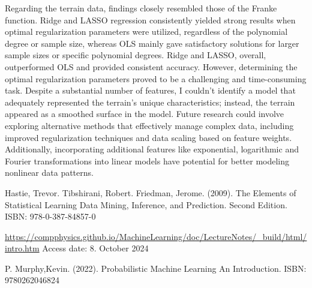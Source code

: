 \documentclass[a4paper,12pt]{article}
\begin{document}
\noindent
Regarding the terrain data, findings closely resembled those of the Franke function. Ridge and LASSO regression consistently yielded strong results when optimal regularization parameters were utilized, regardless of the polynomial degree or sample size, whereas OLS mainly gave satisfactory solutions for larger sample sizes or specific polynomial degrees. Ridge and LASSO, overall, outperformed OLS and provided consistent accuracy. However, determining the optimal regularization parameters proved to be a challenging and time-consuming task. Despite a substantial number of features, I couldn't identify a model that adequately represented the terrain's unique characteristics; instead, the terrain appeared as a smoothed surface in the model. Future research could involve exploring alternative methods that effectively manage complex data, including improved regularization techniques and data scaling based on feature weights. Additionally, incorporating additional features like exponential, logarithmic and Fourier transformations into linear models have potential for better modeling nonlinear data patterns.\\





\cleardoublepage
{}

\begin{thebibliography}{2}

Hastie, Trevor. Tibshirani, Robert. Friedman, Jerome. (2009). The Elements of Statistical Learning Data Mining, Inference, and Prediction. Second Edition. ISBN: 978-0-387-84857-0   

\url{https://compphysics.github.io/MachineLearning/doc/LectureNotes/_build/html/intro.htm} Access date: 8. October 2024

P. Murphy,Kevin. (2022). Probabilistic Machine Learning
An Introduction. ISBN: 9780262046824

\end{thebibliography}

  
\end{document}
